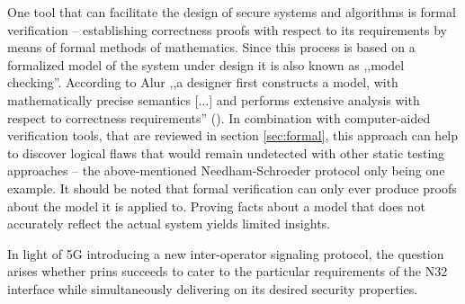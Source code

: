 One tool that can facilitate the design of secure systems and algorithms is formal verification -- establishing correctness proofs with respect to its requirements by means of formal methods of mathematics.
Since this process is based on a formalized model of the system under design it is also known as ,,model checking''.
According to Alur ,,a designer first constructs a model, with mathematically precise semantics [...] and performs extensive analysis with respect to correctness requirements'' (\cite{alur2011formal}).
In combination with computer-aided verification tools, that are reviewed in section \ref{sec:formal}, this approach can help to discover logical flaws that would remain undetected with other static testing approaches -- the above-mentioned Needham-Schroeder protocol only being one example.
It should be noted that formal verification can only ever produce proofs about the model it is applied to.
Proving facts about a model that does not accurately reflect the actual system yields limited insights.

In light of 5G introducing a new inter-operator signaling protocol, the question arises whether \gls{prins} succeeds to cater to the particular requirements of the N32 interface while simultaneously delivering on its desired security properties.

